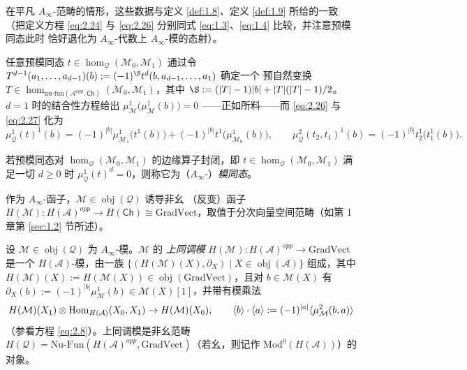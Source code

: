 在平凡 $A_\infty$-范畴的情形，这些数据与定义 \ref{def:1.8}、定义 \ref{def:1.9} 所给的一致（把定义方程
\eqref{eq:2.24} 与 \eqref{eq:2.26} 分别同式 \eqref{eq:1.3}、\eqref{eq:1.4} 比较，并注意预模同态此时
恰好退化为 $A_\infty$-代数上 $A_\infty$-模的态射）。

任意预模同态 $t\in\hom_{\mathcal Q}(\mathcal M_0,\mathcal M_1)$ 通过令
$T^{d-1}(a_1,\dots,a_{d-1})(b):=(-1)^{\text{\S}}t^d(b,a_{d-1},\dots,a_1)$ 确定一个
预自然变换 $T\in\hom_{\mathrm{nu\text{-}fun}(\mathcal A^{opp},\mathsf{Ch})}
(\mathcal M_0,\mathcal M_1)$，其中 $\text{\S}:=(|T|-1)|b|+|T|(|T|-1)/2$。
$d=1$ 时的结合性方程给出 $\mu^1_{\mathcal M}\bigl(\mu^1_{\mathcal M}(b)\bigr)=0$
——正如所料——而 \eqref{eq:2.26} 与 \eqref{eq:2.27} 化为
\[
  \mu^1_{\mathcal Q}(t)^1(b)=(-1)^{|b|}\mu^1_{\mathcal M_1}\bigl(t^1(b)\bigr)
  +(-1)^{|b|}t^1\bigl(\mu^1_{\mathcal M_0}(b)\bigr),
  \qquad
  \mu^2_{\mathcal Q}(t_2,t_1)^1(b)=(-1)^{|b|}t^1_2\bigl(t^1_1(b)\bigr).
\]

\begin{Def}\label{def:2.21}
若预模同态对 $\hom_{\mathcal Q}(\mathcal M_0,\mathcal M_1)$ 的边缘算子封闭，即
$t\in\hom_{\mathcal Q}(\mathcal M_0,\mathcal M_1)$ 满足一切 $d\ge 0$ 时
$\mu^1_{\mathcal Q}(t)^d=0$，则称它为（$A_\infty$-）\emph{模同态}。
\end{Def}

作为 $A_\infty$-函子，$\mathcal M\in\operatorname{obj}(\mathcal Q)$ 诱导非幺
（反变）函子 $H(\mathcal M):H(\mathcal A)^{opp}\to H(\mathsf{Ch})\cong
\mathrm{GradVect}$，取值于分次向量空间范畴（如第 1 章第 \ref{sec:1.2} 节所述）。

\begin{Def}\label{def:2.22}
设 $\mathcal M\in\operatorname{obj}(\mathcal Q)$ 为 $A_\infty$-模。$\mathcal M$ 的
\emph{上同调模} $H(\mathcal M):H(\mathcal A)^{opp}\to\mathrm{GradVect}$ 是一个
$H(\mathcal A)$-模，由一族 $\{(H(\mathcal M)(X),\partial_X)\mid X\in
\operatorname{obj}(\mathcal A)\}$ 组成，其中 $H(\mathcal M)(X):=H(\mathcal M(X))\in
\operatorname{obj}(\mathrm{GradVect})$，且对 $b\in\mathcal M(X)$ 有
$\partial_X(b):=(-1)^{|b|}\mu^1_{\mathcal M}(b)\in\mathcal M(X)[1]$，并带有模乘法
\[
  H(\mathcal M)(X_1)\otimes\operatorname{Hom}_{H(\mathcal A)}(X_0,X_1)\to
  H(\mathcal M)(X_0),\qquad
  \langle b\rangle\cdot\langle a\rangle:=(-1)^{|a|}
  \langle\mu^2_{\mathcal M}(b,a)\rangle
\]
（参看方程 \eqref{eq:2.8}）。上同调模是非幺范畴 $H(\mathcal Q)=\mathrm{Nu\text{-}
Fun}(H(\mathcal A)^{opp},\mathrm{GradVect})$（若幺，则记作 $\mathrm{Mod}^0
(H(\mathcal A))$）的对象。
\end{Def}


